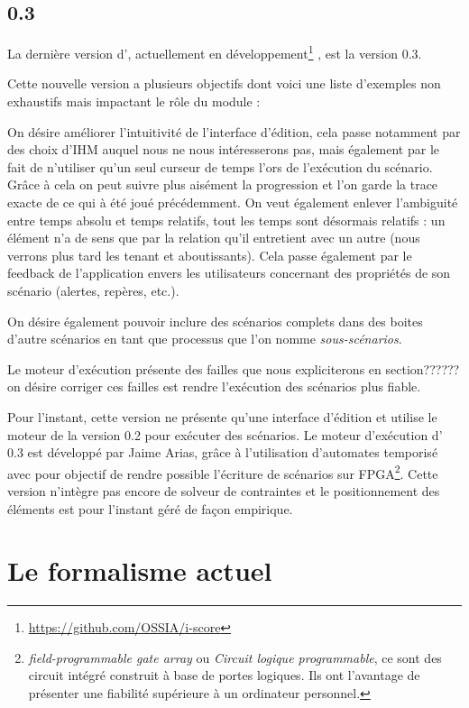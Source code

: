 \subsection{\iscore{} 0.3}%

La dernière version d'\iscore{}, actuellement en développement\footnote{\url{https://github.com/OSSIA/i-score}} \iscore{}, est la version 0.3.

Cette nouvelle version a plusieurs objectifs dont voici une liste d'exemples non exhaustifs mais impactant le rôle du module \csp{} :

On désire améliorer l'intuitivité de l'interface d'édition, cela passe notamment par des choix d'IHM auquel nous ne nous intéresserons pas, mais également par le fait de n'utiliser qu'un seul curseur de temps l'ors de l'exécution du scénario. Grâce à cela on peut suivre plus aisément la progression et l'on garde la trace exacte de ce qui à été joué précédemment. On veut également enlever l'ambiguité entre temps absolu et temps relatifs, tout les temps sont désormais relatifs : un élément n'a de sens que par la relation qu'il entretient avec un autre (nous verrons plus tard les tenant et aboutissants).
Cela passe également par le feedback de l'application envers les utilisateurs concernant des propriétés de son scénario (alertes, repères, etc.).

On désire également pouvoir inclure des scénarios complets dans des boites d'autre scénarios en tant que processus que l'on nomme \emph{sous-scénarios}.

Le moteur d'exécution présente des failles que nous expliciterons en section?????? on désire corriger ces failles est rendre l'exécution des scénarios plus fiable.

Pour l'instant, cette version ne présente qu'une interface d'édition et utilise le moteur de la version 0.2 pour exécuter des scénarios. Le moteur d'exécution d'\iscore{} 0.3 est développé par Jaime Arias, grâce à l'utilisation d'automates temporisé avec pour objectif de rendre possible l'écriture de scénarios sur FPGA\footnote{\emph{field-programmable gate array} ou \emph{Circuit logique programmable}, ce sont des circuit intégré construit à base de portes logiques. Ils ont l'avantage de présenter une fiabilité supérieure à un ordinateur personnel.}.
Cette version n'intègre pas encore de solveur de contraintes et le positionnement des éléments est pour l'instant géré de façon empirique.

\section{Le formalisme actuel}


